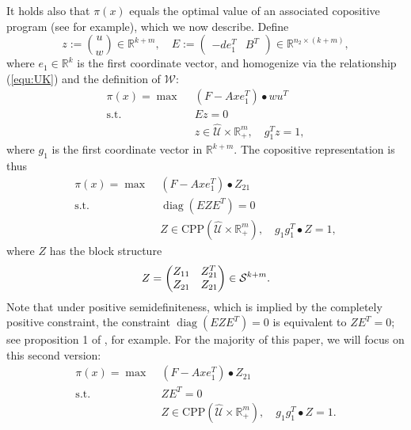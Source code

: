 \documentclass[12pt]{article}
\DeclareMathOperator{\st}{s.t.}
\DeclareMathOperator{\diag}{diag}
\newcommand{\W}{{\mathcal{W}}}
\newcommand{\K}{\widehat{\mathcal{U}}}
\newcommand{\CP}{{\mathrm{CPP}}}
\newcommand{\p}{\pi}
\def\RR{{\mathbb{R}}}
\newcommand{\Q}{{\K \times \RR^m_+}}
\begin{document}
\begin{onehalfspace}
It holds also that $\p(x)$ equals the optimal value of an associated
copositive program (see \cite{Burer.2009,Burer.2011} for example), which
we now describe. Define
\begin{equation} \label{equ:zE}
    z := {u \choose w} \in \RR^{k + m}, \quad
    E := \begin{pmatrix} -de_1^T & B^T \end{pmatrix} \in \RR^{n_2 \times (k + m)},
\end{equation}
where $e_1 \in \RR^k$ is the first coordinate vector, and homogenize
via the relationship (\ref{equ:UK}) and the definition of $\W$:
\begin{align*}
\p(x) = \max \; & \ (F - Axe_1^T) \bullet wu^T  \\  
    \st \; \; & \ E z = 0  \\ 
    & \ z \in \Q, \quad g_1^Tz = 1,
\end{align*}
where $g_1$ is the first coordinate vector in $\RR^{k+m}$. The
copositive representation is thus
\begin{align} \label{equ:qxcppstandard}
    \p(x) = \max \; & (F - Axe_1^T) \bullet Z_{21} \\
\st \; \; &\diag(EZE^T) = 0 \nonumber \\
     & Z \in \CP(\Q), \quad g_1 g_1^T \bullet Z = 1, \nonumber
\end{align}
where $Z$ has the block structure
\[
    Z = \begin{pmatrix}
        Z_{11} & Z_{21}^T \\
        Z_{21} & Z_{21}
    \end{pmatrix} \in {\cal S}^{k+m}.
\]
Note that under positive semidefiniteness, which is implied by the
completely positive constraint, the constraint $\diag(EZE^T) = 0$ is
equivalent to $ZE^T = 0$; see proposition 1 of \cite{Burer.2011}, for
example. For the majority of this paper, we will focus on this second
version:
\begin{align} \label{equ:qxcpp}
    \p(x) = \max \; & (F - Axe_1^T) \bullet Z_{21} \\
\st \; \; & ZE^T = 0 \nonumber \\
     & Z \in \CP(\Q), \quad g_1 g_1^T \bullet Z = 1. \nonumber
\end{align}


\end{onehalfspace}
\end{document}
